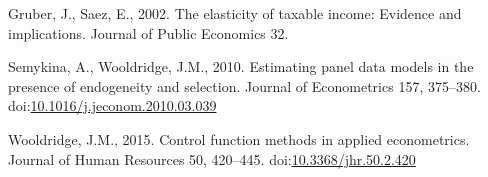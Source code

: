\documentclass[
  11pt,
  a4paper,
]{article}
\newlength{\cslhangindent}
\newlength{\cslentryspacingunit} %
\newenvironment{CSLReferences}[2] %
 {%
  \setlength{\parindent}{0pt}
  \ifodd #1
  \let\oldpar\par
  \def\par{\hangindent=\cslhangindent\oldpar}
  \fi
  \setlength{\parskip}{#2\cslentryspacingunit}
 }%
 {}
\begin{document}
\hypertarget{refs_appx}{}
\begin{CSLReferences}{1}{0}
\leavevmode{}%
Gruber, J., Saez, E., 2002. The elasticity of taxable income: Evidence and implications. Journal of Public Economics 32.

\leavevmode{}%
Semykina, A., Wooldridge, J.M., 2010. Estimating panel data models in the presence of endogeneity and selection. Journal of Econometrics 157, 375--380. doi:\href{https://doi.org/10.1016/j.jeconom.2010.03.039}{10.1016/j.jeconom.2010.03.039}

\leavevmode{}%
Wooldridge, J.M., 2015. Control function methods in applied econometrics. Journal of Human Resources 50, 420--445. doi:\href{https://doi.org/10.3368/jhr.50.2.420}{10.3368/jhr.50.2.420}

\end{CSLReferences}

\clearpage
\end{document}

